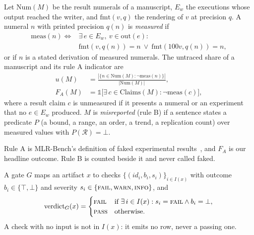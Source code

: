 \documentclass[sigconf,anonymous]{aamas}
\newcommand{\Reg}{\mathcal{R}}
\newcommand{\Man}{M}
\newcommand{\pass}{\textsc{pass}}
\newcommand{\fail}{\textsc{fail}}
\newcommand{\warn}{\textsc{warn}}
\newcommand{\meas}{\mathrm{meas}}
\newcommand{\Num}{\mathrm{Num}}
\newcommand{\ind}{\mathbb{1}}
\begin{document}
\begin{definition}
\label{def:rules}
Let $\Num(\Man)$ be the result numerals of a manuscript, $E_w$ the executions whose output reached the writer, and $\mathrm{fmt}(v, q)$ the rendering of $v$ at precision $q$.
A numeral $n$ with printed precision $q(n)$ is \emph{measured} if
\begin{equation}
\label{eq:meas}
\begin{aligned}
\meas(n) \iff{}& \exists\, e \in E_w,\ v \in \mathrm{out}(e) : \\
& \mathrm{fmt}(v, q(n)) = n \ \lor\ \mathrm{fmt}(100v, q(n)) = n,
\end{aligned}
\end{equation}
or if $n$ is a stated derivation of measured numerals.
The untraced share of a manuscript and its rule A indicator are
\begin{equation}
\label{eq:rulea}
\begin{aligned}
u(\Man) &= \frac{|\{n \in \Num(\Man) : \neg\meas(n)\}|}{|\Num(\Man)|}, \\
F_A(\Man) &= \ind\big[\exists\, c \in \mathrm{Claims}(\Man) : \neg\meas(c)\big],
\end{aligned}
\end{equation}
where a result claim $c$ is unmeasured if it presents a numeral or an experiment that no $e \in E_w$ produced.
$\Man$ is \emph{misreported} (rule B) if a sentence states a predicate $P$ (a bound, a range, an order, a trend, a replication count) over measured values with $P(\Reg) = \bot$.
\end{definition}

Rule A is MLR-Bench's definition of faked experimental results~\cite{chen2025mlrbench}, and $F_A$ is our headline outcome.
Rule B is counted beside it and never called faked.

\begin{definition}
\label{def:gate}
A gate $G$ maps an artifact $x$ to checks $\{(\mathit{id}_i, b_i, s_i)\}_{i \in I(x)}$ with outcome $b_i \in \{\top, \bot\}$ and severity $s_i \in \{\fail, \warn, \textsc{info}\}$, and
\begin{equation}
\label{eq:verdict}
\mathrm{verdict}_G(x) =
\begin{cases}
\fail & \text{if } \exists\, i \in I(x) : s_i = \fail \wedge b_i = \bot, \\
\pass & \text{otherwise.}
\end{cases}
\end{equation}
A check with no input is not in $I(x)$: it emits no row, never a passing one.
\end{definition}
\end{document}
